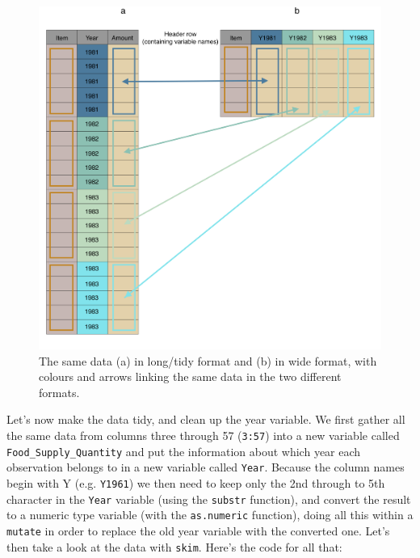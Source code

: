 \documentclass[]{book}
\newenvironment{Shaded}{\begin{snugshade}}{\end{snugshade}}
\newcommand{\CommentTok}[1]{\textcolor[rgb]{0.56,0.35,0.01}{\textit{#1}}}
\newcommand{\DataTypeTok}[1]{\textcolor[rgb]{0.13,0.29,0.53}{#1}}
\newcommand{\DecValTok}[1]{\textcolor[rgb]{0.00,0.00,0.81}{#1}}
\newcommand{\KeywordTok}[1]{\textcolor[rgb]{0.13,0.29,0.53}{\textbf{#1}}}
\newcommand{\NormalTok}[1]{#1}
\newcommand{\OperatorTok}[1]{\textcolor[rgb]{0.81,0.36,0.00}{\textbf{#1}}}
\newcommand{\StringTok}[1]{\textcolor[rgb]{0.31,0.60,0.02}{#1}}
\begin{document}
\begin{figure}

{\centering \includegraphics[width=1\linewidth]{images/long_wide} 

}

\caption{The same data (a) in long/tidy format and (b) in wide format, with colours and arrows linking the same data in the two different formats.}\label{fig:long-wide}
\end{figure}

Let's now make the data tidy, and clean up the year variable. We first gather all the same data from columns three through 57 (\texttt{3:57}) into a new variable called \texttt{Food\_Supply\_Quantity} and put the information about which year each observation belongs to in a new variable called \texttt{Year}. Because the column names begin with Y (e.g. \texttt{Y1961}) we then need to keep only the 2nd through to 5th character in the \texttt{Year} variable (using the \texttt{substr} function), and convert the result to a numeric type variable (with the \texttt{as.numeric} function), doing all this within a \texttt{mutate} in order to replace the old year variable with the converted one. Let's then take a look at the data with \texttt{skim}. Here's the code for all that:

\begin{Shaded}
\end{Shaded}
\end{document}
